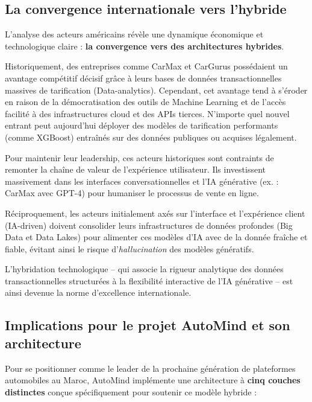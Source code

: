 \documentclass[11pt,a4paper]{article}
\begin{document}
\subsection{La convergence internationale vers l'hybride}
L'analyse des acteurs américains révèle une dynamique économique et technologique claire : \textbf{la convergence vers des architectures hybrides}.

Historiquement, des entreprises comme CarMax et CarGurus possédaient un avantage compétitif décisif grâce à leurs bases de données transactionnelles massives de tarification (Data-analytics). Cependant, cet avantage tend à s'éroder en raison de la démocratisation des outils de Machine Learning et de l'accès facilité à des infrastructures cloud et des APIs tierces. N'importe quel nouvel entrant peut aujourd'hui déployer des modèles de tarification performants (comme XGBoost) entraînés sur des données publiques ou acquises légalement.

Pour maintenir leur leadership, ces acteurs historiques sont contraints de remonter la chaîne de valeur de l'expérience utilisateur. Ils investissent massivement dans les interfaces conversationnelles et l'IA générative (ex. : CarMax avec GPT-4) pour humaniser le processus de vente en ligne.

Réciproquement, les acteurs initialement axés sur l'interface et l'expérience client (IA-driven) doivent consolider leurs infrastructures de données profondes (Big Data et Data Lakes) pour alimenter ces modèles d'IA avec de la donnée fraîche et fiable, évitant ainsi le risque d'\textit{hallucination} des modèles génératifs.

L'hybridation technologique -- qui associe la rigueur analytique des données transactionnelles structurées à la flexibilité interactive de l'IA générative -- est ainsi devenue la norme d'excellence internationale.

\subsection{Implications pour le projet AutoMind et son architecture}
Pour se positionner comme le leader de la prochaine génération de plateformes automobiles au Maroc, AutoMind implémente une architecture à \textbf{cinq couches distinctes} conçue spécifiquement pour soutenir ce modèle hybride :
\end{document}
